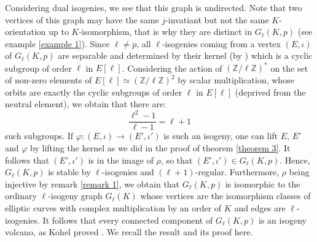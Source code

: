 \documentclass[a4paper,10pt]{report}
\theoremstyle{definition}
\theoremstyle{plain}
\theoremstyle{definition}
\newcommand{\Z}{\mathbb{Z}}
\renewcommand{\(}{\left(}
\renewcommand{\)}{\right)}
\begin{document}
Considering dual isogenies, we see that this graph is undirected. Note that two vertices of this graph may have the same $j$-invatiant but not the same $K$-orientation up to $K$-isomorphism, that is why they are distinct in $G_\ell(K,p)$ (see example \ref{example 1}). Since $\ell\neq p$, all $\ell$-isogenies coming from a vertex $(E,\iota)$ of $G_\ell(K,p)$  are separable and determined by their kernel (by \cite[corollary III.4.11]{Silverman1}) which is a cyclic subgroup of order $\ell$ in $E[\ell]$. Considering the action of $(\Z/\ell\Z)^*$ on the set of non-zero elements of $E[\ell]\simeq(\Z/\ell\Z)^2$ by scalar multiplication, whose orbits are exactly the cyclic subgroups of order $\ell$ in $E[\ell]$ (deprived from the neutral element), we obtain that there are:
\[\frac{\ell^2-1}{\ell-1}=\ell+1\]
such subgroups. If $\varphi:(E,\iota)\longrightarrow (E',\iota')$ is such an isogeny, one can lift $E$, $E'$ and $\varphi$ by lifting the kernel as we did in the proof of theorem \ref{theorem 3}.  It follows that $(E',\iota')$ is in the image of $\rho$, so that $(E',\iota')\in G_\ell(K,p)$. Hence, $G_\ell(K,p)$ is stable by $\ell$-isogenies and $(\ell+1)$-regular.  Furthermore, $\rho$ being injective by remark \ref{remark 1}, we obtain that $G_\ell(K,p)$ is isomorphic to the ordinary $\ell$-isogeny graph $G_\ell(K)$ whose vertices are the isomorphism classes of elliptic curves with complex multiplication by an order of $K$ and edges are $\ell$-isogenies. It follows that every connected component of $G_\ell(K,p)$ is an isogeny volcano, as Kohel proved \cite[proposition 23]{Kohel_thesis}. We recall the result and its proof here.
\end{document}

